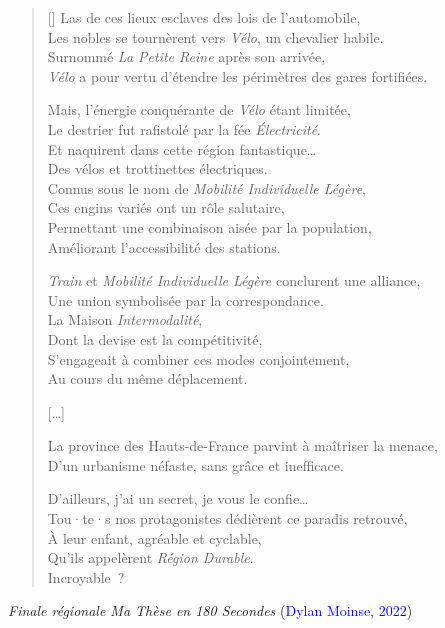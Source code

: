 \begin{verse}[\versewidth]
Las de ces lieux esclaves des lois de l’automobile,\\
Les nobles se tournèrent vers \textsl{Vélo}, un chevalier habile.\\
Surnommé \textsl{La Petite Reine} après son arrivée,\\
\textsl{Vélo} a pour vertu d'étendre les périmètres des gares fortifiées.

Mais, l’énergie conquérante de \textsl{Vélo} étant limitée,\\
Le destrier fut rafistolé par la fée \textsl{Électricité}.\\
Et naquirent dans cette région fantastique\dots\\
Des vélos et trottinettes électriques.\\
Connus sous le nom de \textsl{Mobilité Individuelle Légère},\\
Ces engins variés ont un rôle salutaire,\\
Permettant une combinaison aisée par la population,\\
Améliorant l’accessibilité des stations.

\textsl{Train} et \textsl{Mobilité Individuelle Légère} conclurent une alliance,\\
Une union symbolisée par la correspondance.\\
La Maison \textsl{Intermodalité},\\
Dont la devise est la compétitivité,\\
S'engageait à combiner ces modes conjointement,\\
Au cours du même déplacement.

[\dots]

La province des Hauts-de-France parvint à maîtriser la menace,\\
D’un urbanisme néfaste, sans grâce et inefficace.

D’ailleurs, j’ai un secret, je vous le confie\dots\\
Tou·te·s nos protagonistes dédièrent ce paradis retrouvé,\\
À leur enfant, agréable et cyclable,\\
Qu’ils appelèrent \textsl{Région Durable}.\\
Incroyable~?\\

\end{verse}
\textsl{Finale régionale Ma Thèse en 180 Secondes} (\textcolor{blue}{Dylan Moinse, 2022})

